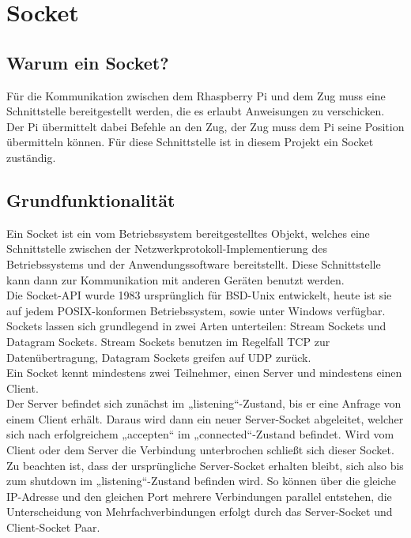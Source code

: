 \chapter{Socket}
\label{chap:socket}

\section{Warum ein Socket?}

Für die Kommunikation zwischen dem Rhaspberry Pi und dem Zug muss eine Schnittstelle bereitgestellt werden, die es erlaubt Anweisungen zu verschicken. Der Pi übermittelt dabei Befehle an den Zug, der Zug muss dem Pi seine Position übermitteln können.
Für diese Schnittstelle ist in diesem Projekt ein Socket zuständig.

\section{Grundfunktionalität}
\label{sec:grundfunktionalität}

Ein Socket ist ein vom Betriebssystem bereitgestelltes Objekt, welches eine Schnittstelle zwischen der Netzwerkprotokoll-Implementierung des Betriebssystems und der Anwendungssoftware bereitstellt. Diese Schnittstelle kann dann zur Kommunikation mit anderen Geräten benutzt werden.\\
Die Socket-API wurde 1983 ursprünglich für BSD-Unix entwickelt, heute ist sie auf jedem POSIX-konformen Betriebssystem, sowie unter Windows verfügbar.\\
Sockets lassen sich grundlegend in zwei Arten unterteilen: Stream Sockets und Datagram Sockets. Stream Sockets benutzen im Regelfall TCP zur Datenübertragung, Datagram Sockets greifen auf UDP zurück.\\
Ein Socket kennt mindestens zwei Teilnehmer, einen Server und mindestens einen Client. \\
Der Server befindet sich zunächst im „listening“-Zustand, bis er eine Anfrage von einem Client erhält. Daraus wird dann ein neuer Server-Socket abgeleitet, welcher sich nach erfolgreichem „accepten“ im „connected“-Zustand befindet. Wird vom Client oder dem Server die Verbindung unterbrochen schließt sich dieser Socket.\\
Zu beachten ist, dass der ursprüngliche Server-Socket erhalten bleibt, sich also bis zum shutdown im „listening“-Zustand befinden wird. So können über die gleiche IP-Adresse und den gleichen Port mehrere Verbindungen parallel entstehen, die Unterscheidung von Mehrfachverbindungen erfolgt durch das Server-Socket und Client-Socket Paar.

